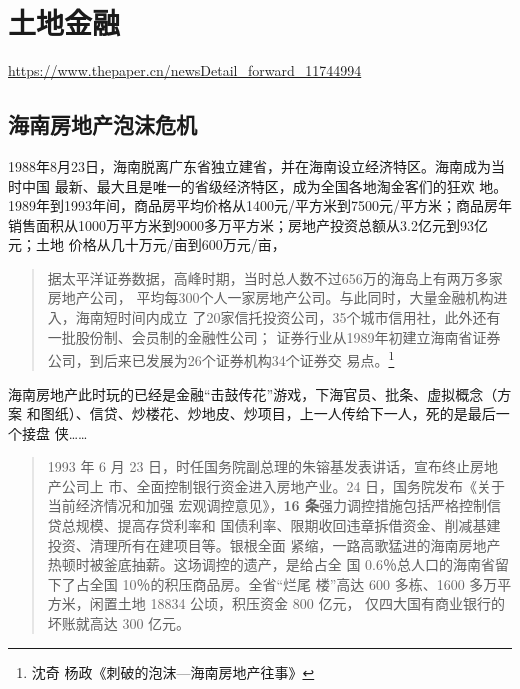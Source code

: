 \section{土地金融}
\label{sec:92tudi}
\url{https://www.thepaper.cn/newsDetail_forward_11744994}




\subsection{海南房地产泡沫危机}
\label{subsec:hainan}


1988年8月23日，海南脱离广东省独立建省，并在海南设立经济特区。海南成为当时中国
最新、最大且是唯一的省级经济特区，成为全国各地淘金客们的狂欢
地。1989年到1993年间，商品房平均价格从1400元/平方米到7500元/平方米；商品房年
销售面积从1000万平方米到9000多万平方米；房地产投资总额从3.2亿元到93亿元；土地
价格从几十万元/亩到600万元/亩，


\begin{quotation}
  据太平洋证券数据，高峰时期，当时总人数不过656万的海岛上有两万多家房地产公司，
  平均每300个人一家房地产公司。与此同时，大量金融机构进入，海南短时间内成立
  了20家信托投资公司，35个城市信用社，此外还有一批股份制、会员制的金融性公司；
  证券行业从1989年初建立海南省证券公司，到后来已发展为26个证券机构34个证券交
  易点。\footnote{沈奇 杨政《刺破的泡沫—海南房地产往事》}
\end{quotation}
海南房地产此时玩的已经是金融“击鼓传花”游戏，下海官员、批条、虚拟概念（方案
和图纸）、信贷、炒楼花、炒地皮、炒项目，上一人传给下一人，死的是最后一个接盘
侠……

\begin{quotation}
  1993 年 6 月 23 日，时任国务院副总理的朱镕基发表讲话，宣布终止房地产公司上
  市、全面控制银行资金进入房地产业。24 日，国务院发布《关于当前经济情况和加强
  宏观调控意见》，\textbf{16 条}强力调控措施包括严格控制信贷总规模、提高存贷利率和
  国债利率、限期收回违章拆借资金、削减基建投资、清理所有在建项目等。银根全面
  紧缩，一路高歌猛进的海南房地产热顿时被釜底抽薪。这场调控的遗产，是给占全
  国 0.6％总人口的海南省留下了占全国 10％的积压商品房。全省“烂尾
  楼”高达 600 多栋、1600 多万平方米，闲置土地 18834 公顷，积压资金 800 亿元，
  仅四大国有商业银行的坏账就高达 300 亿元。
\end{quotation}

